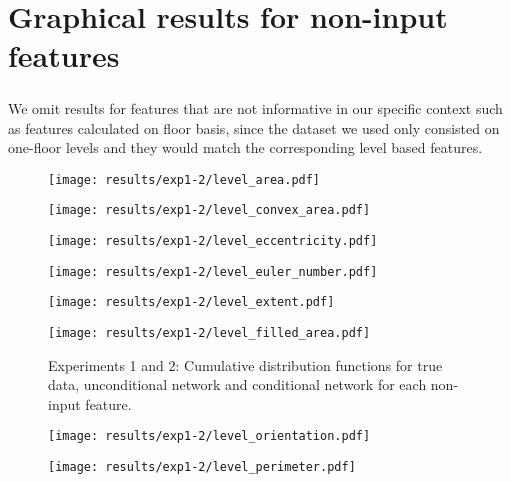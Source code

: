 \chapter{Graphical results for non-input features}
\paragraph{} We omit results for features that are not informative in our specific context such as features calculated on floor basis, since the dataset we used only consisted on one-floor levels and they would match the corresponding level based features.
\label{sec:appendix-graphs}
\begin{figure}[ht]
	\begin{minipage}[b]{0.45\linewidth}
		\centering
		\texttt{[image: results/exp1-2/level\_area.pdf]} 
		\label{fig:results-noninput-level_area}
	\end{minipage}
	\begin{minipage}[b]{0.45\linewidth}
		\centering
		\texttt{[image: results/exp1-2/level\_convex\_area.pdf]} 
		\label{fig:results-noninput-level_convex_area}
	\end{minipage} 
	
	
	\begin{minipage}[b]{0.45\linewidth}
		\centering
		\texttt{[image: results/exp1-2/level\_eccentricity.pdf]} 
		\label{fig:results-noninput-level_eccentricity}
	\end{minipage}
	\begin{minipage}[b]{0.45\linewidth}
		\centering
		\texttt{[image: results/exp1-2/level\_euler\_number.pdf]} 
		\label{fig:results-noninput-level_euler_number}
	\end{minipage} 
	
	
	\begin{minipage}[b]{0.45\linewidth}
		\centering
		\texttt{[image: results/exp1-2/level\_extent.pdf]} 
		\label{fig:results-noninput-level_extent}
	\end{minipage}
	\begin{minipage}[b]{0.45\linewidth}
		\centering
		\texttt{[image: results/exp1-2/level\_filled\_area.pdf]} 
		\label{fig:results-noninput-level_filled_area}
	\end{minipage} 
	
	
	\caption[Graphical results for experiments 1 and 2]{Experiments 1 and 2: Cumulative distribution functions for true data, unconditional network and conditional network for each non-input feature.}
\end{figure}\begin{figure}[ht]
	\begin{minipage}[b]{0.45\linewidth}
		\centering
		\texttt{[image: results/exp1-2/level\_orientation.pdf]} 
		\label{fig:results-noninput-level_orientation}
	\end{minipage}
	\begin{minipage}[b]{0.45\linewidth}
		\centering
		\texttt{[image: results/exp1-2/level\_perimeter.pdf]} 
		\label{fig:results-noninput-level_perimeter}
	\end{minipage} 
	

\end{figure}
